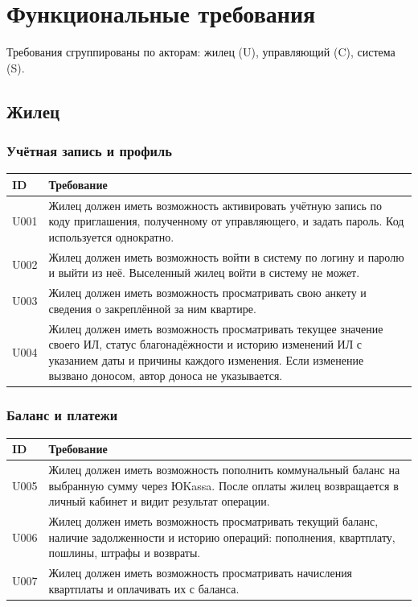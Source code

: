 \documentclass[12pt,a4paper]{article}
\newenvironment{reqtable}{%
  \begin{longtable}{L{14mm} L{146mm}}
  \toprule
  \textbf{ID} & \textbf{Требование} \\
  \midrule
  \endhead
  \bottomrule
  \endfoot
}{\end{longtable}}
\begin{document}
\section{Функциональные требования}

Требования сгруппированы по акторам: жилец (U), управляющий (C), система (S).

\subsection{Жилец}

\subsubsection*{Учётная запись и профиль}
\begin{reqtable}
U001 & Жилец должен иметь возможность активировать учётную запись по коду приглашения, полученному от управляющего, и задать пароль. Код используется однократно. \\
U002 & Жилец должен иметь возможность войти в систему по логину и паролю и выйти из неё. Выселенный жилец войти в систему не может. \\
U003 & Жилец должен иметь возможность просматривать свою анкету и сведения о закреплённой за ним квартире. \\
U004 & Жилец должен иметь возможность просматривать текущее значение своего ИЛ, статус благонадёжности и историю изменений ИЛ с указанием даты и причины каждого изменения. Если изменение вызвано доносом, автор доноса не указывается. \\
\end{reqtable}

\subsubsection*{Баланс и платежи}
\begin{reqtable}
U005 & Жилец должен иметь возможность пополнить коммунальный баланс на выбранную сумму через ЮKassa. После оплаты жилец возвращается в личный кабинет и видит результат операции. \\
U006 & Жилец должен иметь возможность просматривать текущий баланс, наличие задолженности и историю операций: пополнения, квартплату, пошлины, штрафы и возвраты. \\
U007 & Жилец должен иметь возможность просматривать начисления квартплаты и оплачивать их с баланса. \\
\end{reqtable}
\end{document}
